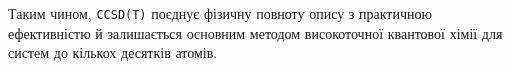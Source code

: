 Таким чином, \texttt{CCSD(T)} поєднує фізичну повноту опису з практичною
ефективністю й залишається основним методом високоточної
квантової хімії для систем до кількох десятків атомів.


%
%
%
%





